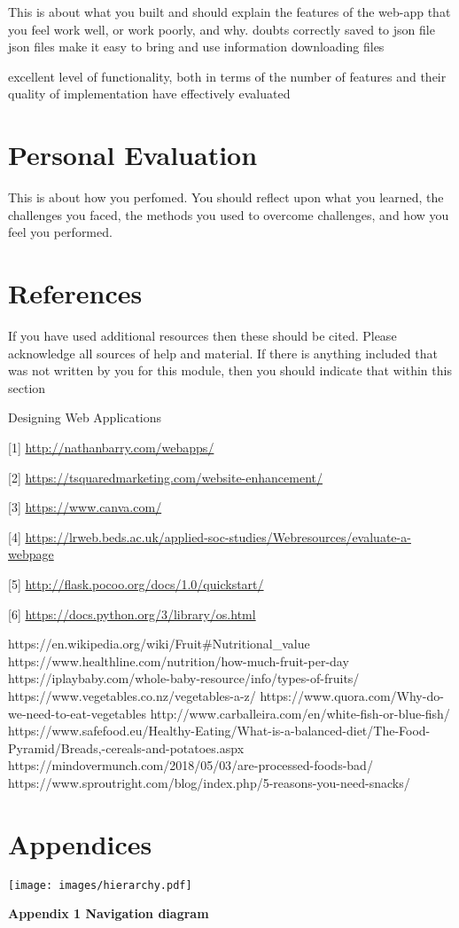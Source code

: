 \documentclass[10pt, a4paper]{article}
\begin{document}
    This is about what you built and should explain the features of the web-app that you feel work well, or work poorly, and why.
doubts correctly saved to json file
json files make it easy to bring and use information
downloading files

 excellent level of functionality, both in terms of the number of
features and their quality of implementation
 have effectively evaluated

    \section{Personal Evaluation}
    This is about how you perfomed. You should reflect upon what you learned,
the challenges you faced, the methods you used to overcome challenges, and how you feel you performed.

    \section{References}
    If you have used additional resources then these should be cited. Please acknowledge all sources of help and material. If there is anything included that was not written by you for this module, then you should indicate that within this section

    Designing Web Applications

    [1] \url{http://nathanbarry.com/webapps/}

    [2] \url{https://tsquaredmarketing.com/website-enhancement/}

    [3] \url{https://www.canva.com/}

    [4] \url{https://lrweb.beds.ac.uk/applied-soc-studies/Webresources/evaluate-a-webpage}

    [5] \url{http://flask.pocoo.org/docs/1.0/quickstart/}

    [6] \url{https://docs.python.org/3/library/os.html}

https://en.wikipedia.org/wiki/Fruit#Nutritional_value
https://www.healthline.com/nutrition/how-much-fruit-per-day
https://iplaybaby.com/whole-baby-resource/info/types-of-fruits/
https://www.vegetables.co.nz/vegetables-a-z/
https://www.quora.com/Why-do-we-need-to-eat-vegetables
http://www.carballeira.com/en/white-fish-or-blue-fish/
https://www.safefood.eu/Healthy-Eating/What-is-a-balanced-diet/The-Food-Pyramid/Breads,-cereals-and-potatoes.aspx
https://mindovermunch.com/2018/05/03/are-processed-foods-bad/
https://www.sproutright.com/blog/index.php/5-reasons-you-need-snacks/

    \section{Appendices}

    \texttt{[image: images/hierarchy.pdf]}

    \textbf{Appendix 1 Navigation diagram}
    \vspace{2mm}
\end{document}
